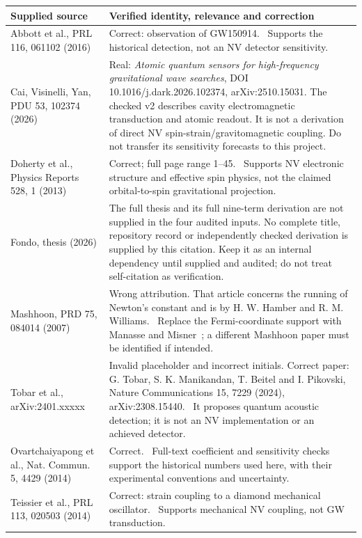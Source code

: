 \documentclass[a4paper,11pt]{article}
\begin{document}
\begin{longtable}{@{}P{42mm}P{113mm}@{}}\toprule
Supplied source & Verified identity, relevance and correction\\\midrule\endhead
Abbott et al., PRL 116, 061102 (2016) & Correct: observation of GW150914.~\cite{abbott} Supports the historical detection, not an NV detector sensitivity.\\
Cai, Visinelli, Yan, PDU 53, 102374 (2026) & Real: \emph{Atomic quantum sensors for high-frequency gravitational wave searches}, DOI 10.1016/j.dark.2026.102374, arXiv:2510.15031. The checked v2 describes cavity electromagnetic transduction and atomic readout. It is not a derivation of direct NV spin-strain/gravitomagnetic coupling. Do not transfer its sensitivity forecasts to this project.~\cite{cai}\\
Doherty et al., Physics Reports 528, 1 (2013) & Correct; full page range 1--45.~\cite{doherty} Supports NV electronic structure and effective spin physics, not the claimed orbital-to-spin gravitational projection.\\
Fondo, thesis (2026) & The full thesis and its full nine-term derivation are not supplied in the four audited inputs. No complete title, repository record or independently checked derivation is supplied by this citation. Keep it as an internal dependency until supplied and audited; do not treat self-citation as verification.\\
Mashhoon, PRD 75, 084014 (2007) & Wrong attribution. That article concerns the running of Newton's constant and is by H. W. Hamber and R. M. Williams.~\cite{hamber} Replace the Fermi-coordinate support with Manasse and Misner~\cite{manasse}; a different Mashhoon paper must be identified if intended.\\
Tobar et al., arXiv:2401.xxxxx & Invalid placeholder and incorrect initials. Correct paper: G. Tobar, S. K. Manikandan, T. Beitel and I. Pikovski, Nature Communications 15, 7229 (2024), arXiv:2308.15440.~\cite{tobar} It proposes quantum acoustic detection; it is not an NV implementation or an achieved detector.\\
Ovartchaiyapong et al., Nat. Commun. 5, 4429 (2014) & Correct.~\cite{ovart} Full-text coefficient and sensitivity checks support the historical numbers used here, with their experimental conventions and uncertainty.\\
Teissier et al., PRL 113, 020503 (2014) & Correct: strain coupling to a diamond mechanical oscillator.~\cite{teissier} Supports mechanical NV coupling, not GW transduction.\\

\end{longtable}
\end{document}
